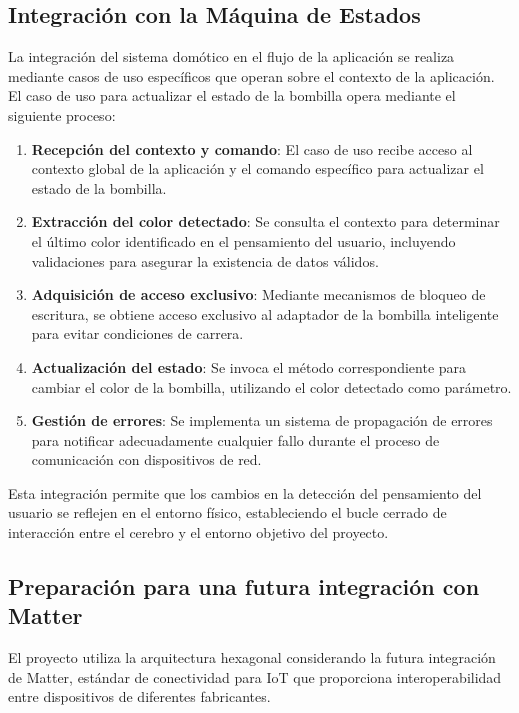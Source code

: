 \subsection{Integración con la Máquina de Estados}

La integración del sistema domótico en el flujo de la aplicación se realiza mediante casos de uso específicos que operan sobre el contexto de la aplicación. El caso de uso para actualizar el estado de la bombilla opera mediante el siguiente proceso:

\begin{enumerate}
    \item \textbf{Recepción del contexto y comando}: El caso de uso recibe acceso al contexto global de la aplicación y el comando específico para actualizar el estado de la bombilla.
    
    \item \textbf{Extracción del color detectado}: Se consulta el contexto para determinar el último color identificado en el pensamiento del usuario, incluyendo validaciones para asegurar la existencia de datos válidos.
    
    \item \textbf{Adquisición de acceso exclusivo}: Mediante mecanismos de bloqueo de escritura, se obtiene acceso exclusivo al adaptador de la bombilla inteligente para evitar condiciones de carrera.
    
    \item \textbf{Actualización del estado}: Se invoca el método correspondiente para cambiar el color de la bombilla, utilizando el color detectado como parámetro.
    
    \item \textbf{Gestión de errores}: Se implementa un sistema de propagación de errores para notificar adecuadamente cualquier fallo durante el proceso de comunicación con dispositivos de red.
\end{enumerate}

Esta integración permite que los cambios en la detección del pensamiento del usuario se reflejen en el entorno físico, estableciendo el bucle cerrado de interacción entre el cerebro y el entorno objetivo del proyecto.

\newpage
\subsection{Preparación para una futura integración con Matter}

El proyecto utiliza la arquitectura hexagonal considerando la futura integración de Matter, estándar de conectividad para IoT que proporciona interoperabilidad entre dispositivos de diferentes fabricantes.

